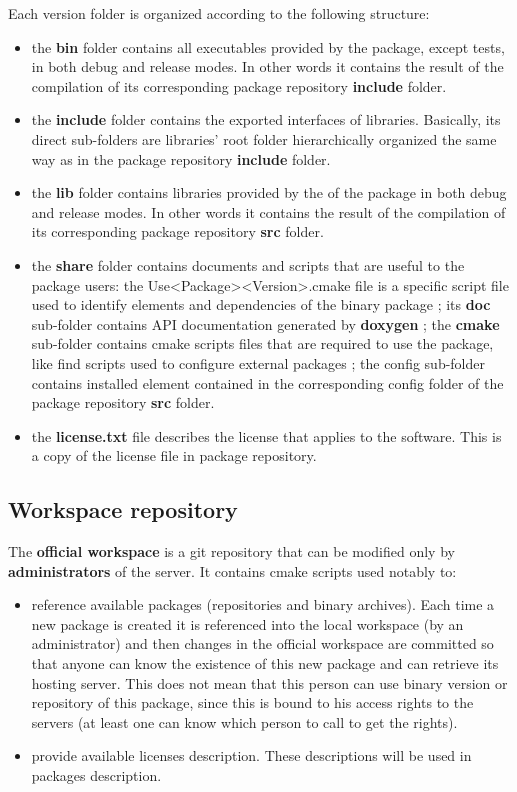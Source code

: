 \documentclass[12pt,a4paper]{article}
\begin{document}
Each version folder is organized according to the following structure:
\begin{itemize}
\item the \textbf{bin} folder contains all executables provided by the package, except tests, in both debug and release modes. In other words it contains the result of the compilation of its corresponding package repository \textbf{include} folder.
\item the \textbf{include} folder contains the exported interfaces of libraries. Basically, its direct sub-folders are libraries' root folder hierarchically organized the same way as in the package repository \textbf{include} folder.
\item the \textbf{lib} folder contains libraries provided by the of the package in both debug and release modes.  In other words it contains the result of the compilation of its corresponding package repository \textbf{src} folder.
\item the \textbf{share} folder contains documents and scripts that are useful to the package users: the Use<Package><Version>.cmake file is a specific script file used to identify elements and dependencies of the binary package ; its \textbf{doc} sub-folder  contains API documentation generated by \textbf{doxygen} ; the \textbf{cmake} sub-folder contains cmake scripts files that are required to use the package, like find scripts used to configure external packages ; the config sub-folder contains installed element contained in the corresponding config folder of the package repository \textbf{src} folder.
\item the \textbf{license.txt} file describes the license that applies to the software. This is a copy of the license file in package repository.
\end{itemize}

\subsection{Workspace repository}

The \textbf{official workspace} is a git repository that can be modified only by \textbf{administrators} of the server. It contains cmake scripts used notably to:
\begin{itemize}
\item reference available packages (repositories and binary archives). Each time a new package is created it is referenced into the local workspace (by an administrator) and then changes in the official workspace are committed so that anyone can know the existence of this new package and can retrieve its hosting server. This does not mean that this person can use binary version or repository of this package, since this is bound to his access rights to the servers (at least one can know which person to call to get the rights).
\item provide available licenses description. These descriptions will be used in packages description.
\end{itemize}
\end{document}

